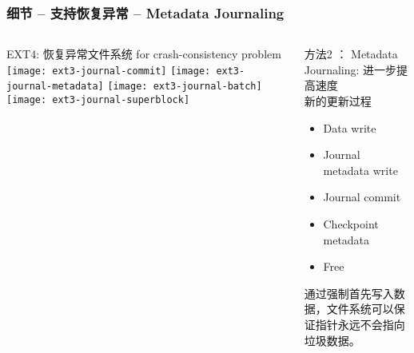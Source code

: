 \begin{frame}[fragile]
	\frametitle{细节 -- 支持恢复异常 -- Metadata Journaling}
	\begin{columns}
		\begin{column}{.5\textwidth}
			EXT4: 恢复异常文件系统 for crash-consistency problem
			\texttt{[image: ext3-journal-commit]}
			\texttt{[image: ext3-journal-metadata]}
			\texttt{[image: ext3-journal-batch]}
			\texttt{[image: ext3-journal-superblock]}
		\end{column}
		\begin{column}{.5\textwidth}			
			方法2 ： Metadata Journaling: 进一步提高速度 \\
			新的更新过程
			\begin{itemize}	
				\item Data write
				\item Journal metadata write
				\item Journal commit
				\item Checkpoint metadata
				\item Free
				
			\end{itemize}
			通过强制首先写入数据，文件系统可以保证指针永远不会指向垃圾数据。
		\end{column}
	\end{columns}
	
\end{frame}



